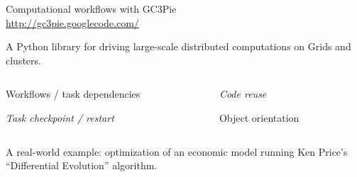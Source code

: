 \documentclass[english,9pt]{beamer}
\renewcommand{\H}[1]{\+{\Large\bfseries #1}\-}
\renewcommand\-{\vspace{0.5em}}
\newcommand\+{\vspace{1.5em}}
\begin{document}



\begin{frame}{%
    {Computational workflows with GC3Pie}
    \\
    {\url{http://gc3pie.googlecode.com/}}
  }%
\thispagestyle{empty}\rm

\H{What is GC3Pie?}

A Python library for driving large-scale distributed computations on
Grids and clusters.


\H{Why GC3Pie?}

\begin{columns}[t]
  \centering
  \begin{column}{.50\textwidth}
    {Workflows / task dependencies}

    {\em Task checkpoint / restart}
  \end{column}
  \begin{column}{.40\textwidth}
    {\em Code reuse}

    {Object orientation}
  \end{column}
\end{columns}

\H{The Poster}

A real-world example: optimization of an economic model running Ken Price's
``Differential Evolution'' algorithm.

\end{frame}
\end{document}
